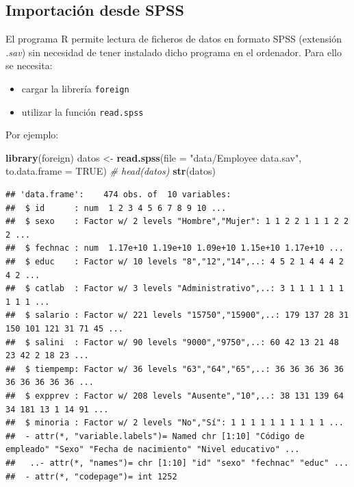 \documentclass[
]{book}
\newenvironment{Shaded}{\begin{snugshade}}{\end{snugshade}}
\newcommand{\AttributeTok}[1]{\textcolor[rgb]{0.13,0.29,0.53}{#1}}
\newcommand{\CommentTok}[1]{\textcolor[rgb]{0.56,0.35,0.01}{\textit{#1}}}
\newcommand{\ConstantTok}[1]{\textcolor[rgb]{0.56,0.35,0.01}{#1}}
\newcommand{\FunctionTok}[1]{\textcolor[rgb]{0.13,0.29,0.53}{\textbf{#1}}}
\newcommand{\NormalTok}[1]{#1}
\newcommand{\OtherTok}[1]{\textcolor[rgb]{0.56,0.35,0.01}{#1}}
\newcommand{\StringTok}[1]{\textcolor[rgb]{0.31,0.60,0.02}{#1}}
\begin{document}
\hypertarget{importaciuxf3n-desde-spss}{%
\subsection{Importación desde SPSS}\label{importaciuxf3n-desde-spss}}

El programa R permite lectura de ficheros de datos en formato SPSS (extensión \emph{.sav}) sin necesidad de tener instalado dicho programa en el ordenador. Para ello se necesita:

\begin{itemize}
\item
  cargar la librería \texttt{foreign}
\item
  utilizar la función \texttt{read.spss}
\end{itemize}

Por ejemplo:

\small

\begin{Shaded}
\begin{Highlighting}[]
\FunctionTok{library}\NormalTok{(foreign)}
\NormalTok{datos }\OtherTok{\textless{}{-}} \FunctionTok{read.spss}\NormalTok{(}\AttributeTok{file =} \StringTok{"data/Employee data.sav"}\NormalTok{, }
                   \AttributeTok{to.data.frame =} \ConstantTok{TRUE}\NormalTok{)}
\CommentTok{\# head(datos)}
\FunctionTok{str}\NormalTok{(datos)}
\end{Highlighting}
\end{Shaded}

\begin{verbatim}
## 'data.frame':    474 obs. of  10 variables:
##  $ id      : num  1 2 3 4 5 6 7 8 9 10 ...
##  $ sexo    : Factor w/ 2 levels "Hombre","Mujer": 1 1 2 2 1 1 1 2 2 2 ...
##  $ fechnac : num  1.17e+10 1.19e+10 1.09e+10 1.15e+10 1.17e+10 ...
##  $ educ    : Factor w/ 10 levels "8","12","14",..: 4 5 2 1 4 4 4 2 4 2 ...
##  $ catlab  : Factor w/ 3 levels "Administrativo",..: 3 1 1 1 1 1 1 1 1 1 ...
##  $ salario : Factor w/ 221 levels "15750","15900",..: 179 137 28 31 150 101 121 31 71 45 ...
##  $ salini  : Factor w/ 90 levels "9000","9750",..: 60 42 13 21 48 23 42 2 18 23 ...
##  $ tiempemp: Factor w/ 36 levels "63","64","65",..: 36 36 36 36 36 36 36 36 36 36 ...
##  $ expprev : Factor w/ 208 levels "Ausente","10",..: 38 131 139 64 34 181 13 1 14 91 ...
##  $ minoria : Factor w/ 2 levels "No","Sí": 1 1 1 1 1 1 1 1 1 1 ...
##  - attr(*, "variable.labels")= Named chr [1:10] "Código de empleado" "Sexo" "Fecha de nacimiento" "Nivel educativo" ...
##   ..- attr(*, "names")= chr [1:10] "id" "sexo" "fechnac" "educ" ...
##  - attr(*, "codepage")= int 1252
\end{verbatim}
\end{document}
